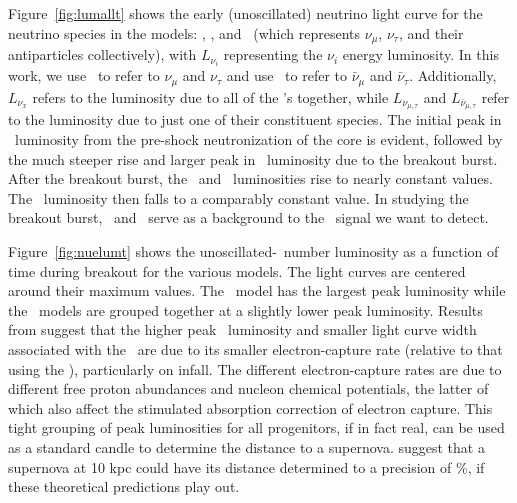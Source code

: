 Figure~\ref{fig:lumallt} shows the early (unoscillated) neutrino light curve for the
neutrino species in the models: \nue, \anue, and \nux\ (which represents
$\nu_\mu$, $\nu_\tau$, and their antiparticles collectively), with
$L_{\nu_i}$ representing the $\nu_i$ energy luminosity. In this work,
we use \nuxpart\ to refer to $\nu_\mu$ and $\nu_\tau$ and use \nuxanti\
to refer to $\bar\nu_\mu$ and $\bar\nu_\tau$.
Additionally, $L_{\nu_x}$ refers to the luminosity due to all of
the \nux's together, while  $L_{\nu_{\mu,\tau}}$ and
$L_{\bar\nu_{\mu,\tau}}$ refer to the luminosity due to just
one of their constituent species.
The initial peak in \nue\ luminosity
from the pre-shock neutronization of the core is evident, followed
by the much steeper rise and
larger peak in \nue\ luminosity due to the breakout burst. After the 
breakout burst, the \anue\ and
\nux\ luminosities rise to nearly constant values.  The \nue\ luminosity
then falls to a comparably constant value.  In studying the
breakout burst, \anue\ and \nux\ serve as a background 
to the \nue\ signal we want to detect.

Figure~\ref{fig:nuelumt} shows the unoscillated-\nue\ number luminosity as a function of
time during breakout for the various models. The light curves are
centered around their maximum values. The \shen\ model has the largest
peak luminosity
while the \ls\ models are grouped together at a slightly lower peak
luminosity. 
Results from \cite{sullivanetal2015} suggest that the higher peak 
\nue\ luminosity and smaller light curve width associated with the \shen\ 
are due to its smaller electron-capture rate (relative to that 
using the \ls), particularly on infall.  The different 
electron-capture rates are due to different free proton 
abundances and nucleon chemical potentials, the latter of which 
also affect the stimulated absorption correction of electron capture.
This tight grouping of peak luminosities for all progenitors, 
if in fact real,
can be used as a standard candle to determine the distance to a
supernova.  \cite{kachelriessetal2005} suggest that a supernova at 10 kpc
could have its distance determined to a precision of \abt 5\%, if these
theoretical predictions play out.

